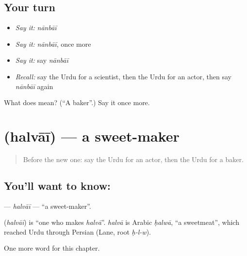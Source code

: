 \subsection*{Your turn}
\begin{itemize}
\raggedright
  \item \emph{Say it:} \emph{nānbāī}
  \item \emph{Say it:} \emph{nānbāī}, once more
  \item \emph{Say it:} say \emph{nānbāī}
  \item \emph{Recall:} say the Urdu for a scientist, then the Urdu for an actor, then say \emph{nānbāī} again
\end{itemize}

\begin{tcolorbox}[breakable,colback=teal!4,colframe=teal!35!black,title={Before you move on}]
What does  mean? (\textquotedblleft{}A baker\textquotedblright{}.) Say it once more.
\end{tcolorbox}
\section[\texorpdfstring{\ur{حلوائی} (halvāī)}{حلوائی (halvāī)}]{ (halvāī) — a sweet-maker}

\label{lesson:UR-C263-halvai}



\begin{quote}
Before the new one: say the Urdu for an actor, then the Urdu for a baker.
\end{quote}

\subsection*{You'll want to know: }
\textbf{} — \emph{halvāī} — \textquotedblleft{}a sweet-maker\textquotedblright{}.

\begin{cousinweb}
\textbf{} (\emph{halvāī}) is \textquotedblleft{}one who makes \emph{halvā}\textquotedblright{}. \emph{halvā} is Arabic \emph{ḥalwā}, \textquotedblleft{}a sweetmeat\textquotedblright{}, which reached Urdu through Persian (Lane, root \emph{ḥ-l-w}).
\end{cousinweb}

\begin{grammarlens}[title={What you've built}]
One more word for this chapter.
\end{grammarlens}

